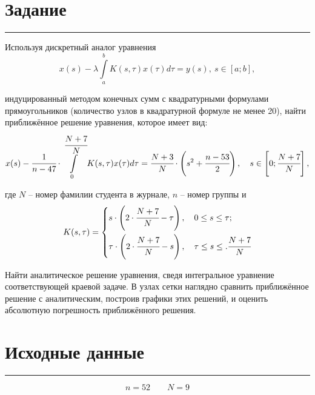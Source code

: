 \documentclass[a4paper, 14pt]{extarticle}
\begin{document}


\section*{Задание}\vspace{-20pt}\rule{\linewidth}{0.1mm}

Используя дискретный аналог уравнения 
\begin{equation*}
    x(s) - \lambda\int\limits^b_a K(s, \tau)x(\tau)d\tau = y(s),\ s \in \left[a; b\right],
\end{equation*}

индуцированный методом конечных сумм с квадратурными формулами прямоугольников
(количество узлов в квадратурной формуле не менее 20), найти приближённое решение
уравнения, которое имеет вид:
\begin{equation*}
    x(s) - \cfrac{1}{n - 47} \cdot \int\limits_0^{\cfrac{N + 7}{N}} 
    K(s, \tau)x(\tau)d\tau = \cfrac{N + 3}{N} \cdot \left(s^2 + \cfrac{n - 53}{2}\right), 
    \quad s \in \left[0; \cfrac{N + 7}{N}\right],
\end{equation*}

где $N$ -- номер фамилии студента в журнале, $n$ -- номер группы и
\begin{equation*}
    K(s, \tau) = \begin{cases*}
        s \cdot \left(2 \cdot \cfrac{N + 7}{N} - \tau \right), \quad 0 \leq s \leq \tau; \\
        \tau \cdot \left(2 \cdot \cfrac{N + 7}{N} - s \right), \quad \tau \leq s \leq. 
        \cfrac{N + 7}{N}
    \end{cases*}
\end{equation*}

Найти аналитическое решение уравнения, сведя интегральное уравнение соответствующей краевой задаче.
В узлах сетки наглядно сравнить приближённое решение с аналитическим, построив
графики этих решений, и оценить абсолютную погрешность приближённого решения.

\section*{Исходные данные}\vspace{-20pt}\rule{\linewidth}{0.1mm}

\begin{equation*}
    n = 52 \qquad N = 9
\end{equation*}
\end{document}
